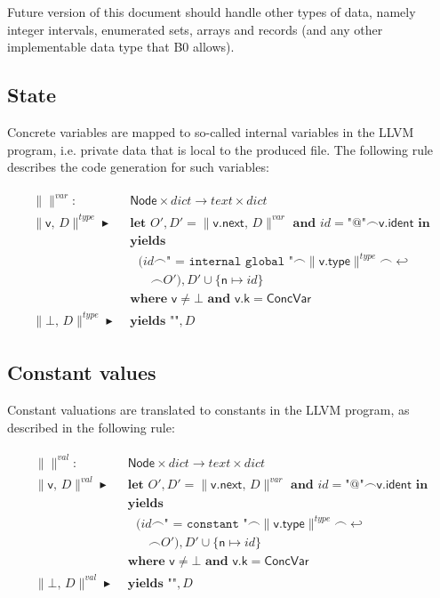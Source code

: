 \documentclass{article}
\newcommand{\trad}[2]{\ensuremath{\lVert \textsf{#1} \rVert^{\textit{#2}}}}
\newcommand{\nl}[0]{\ensuremath{\hookleftarrow}}
\DeclareMathOperator{\conc}{\smallfrown}
\DeclareMathOperator{\isdef}{\blacktriangleright}
\begin{document}
Future version of this document should handle other types of data,
namely integer intervals, enumerated sets, arrays and records (and
any other implementable data type that B0 allows).

\subsection{State}
\label{sec:state}

Concrete variables are mapped to so-called internal variables in the
LLVM program, i.e. private data that is local to the produced
file. The following rule describes the code generation for such
variables:
\begin{framed}
\begin{align}
\begin{split}
  \trad{}{var} : & \textsf{ Node} \times dict \rightarrow text \times dict \\
  \trad{v, $D$}{type} \isdef & \textbf{ let } O', D' = \trad{v.next, $D$}{var} \textbf{ and } 
  id = \texttt{"@"} \conc \textsf{v.ident} \textbf{ in} \\
  & \textbf{ yields } \\
  & \quad (id \conc \texttt{" = internal global "} \conc \trad{v.type}{type} \conc \nl \\
  & \quad \quad \conc O'), D' \cup \{ \textsf{n} \mapsto id \} \\
  & \textbf{ where } \textsf{v} \ne \bot \textbf{ and } \textsf{v.k} = \textsf{ConcVar} \\
  \trad{$\bot$, $D$}{type} \isdef & \textbf{ yields } \texttt{""}, D
\end{split}
\end{align}
\end{framed}

\subsection{Constant values}
\label{sec:values}

Constant valuations are translated to constants in the
LLVM program, as described in the following rule:
\begin{framed}
\begin{align}
\begin{split}
  \trad{}{val} : & \textsf{ Node} \times dict \rightarrow text \times dict \\
  \trad{v, $D$}{val} \isdef & \textbf{ let } O', D' = \trad{v.next, $D$}{var} \textbf{ and } 
  id = \texttt{"@"} \conc \textsf{v.ident} \textbf{ in} \\
  & \textbf{ yields } \\
  & \quad (id \conc \texttt{" = constant "} \conc \trad{v.type}{type} \conc \nl \\
  & \quad \quad \conc O'), D' \cup \{ \textsf{n} \mapsto id \} \\
  & \textbf{ where } \textsf{v} \ne \bot \textbf{ and } \textsf{v.k} = \textsf{ConcVar} \\
  \trad{$\bot$, $D$}{val} \isdef & \textbf{ yields } \texttt{""}, D
\end{split}
\end{align}
\end{framed}
\end{document}
